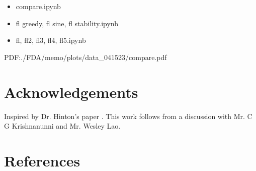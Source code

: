 \begin{itemize}
\item compare.ipynb
\item fl greedy, fl sine, fl stability.ipynb
\item fl, fl2, fl3, fl4, fl5.ipynb
\end{itemize}

PDF:./FDA/memo/plots/data_041523/compare.pdf

% 

\section{Acknowledgements}
Inspired by Dr. Hinton's paper \cite{FFA23}.
This work follows from a discussion with Mr. C G Krishnanunni and Mr. Wesley Lao.
\section{References}


